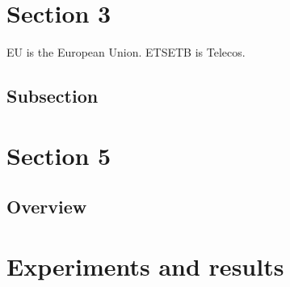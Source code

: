 \documentclass[a4paper]{article}
\begin{document}


\newpage
\tableofcontents

\newpage
\listoffigures
\lstlistoflistings
\listoftables

\newpage

\newpage

\newpage

\newpage


\newpage


\newpage



\clearpage





\newpage
\section{Section 3}
\label{sec:sec3}

\lipsum[4] \ac{EU} is the European Union. \lipsum[5]
\lipsum[6] \ac{ETSETB} is Telecos. \lipsum[7]

\subsection{Subsection}
\label{sec:subsec3.1}





\newpage
\section{Section 5}
\label{sec:sect5}
\lipsum[4]

\subsection{Overview}
\label{subsec:sect5Overview}
\lipsum[10]

\clearpage
\section{Experiments and results}
\label{sec:tests}
\lipsum[9]
\end{document}
